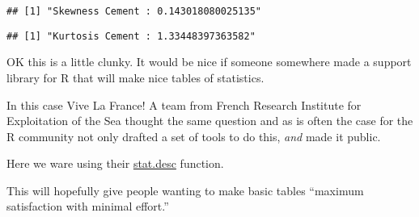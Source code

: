 \documentclass[]{article}
\newenvironment{Shaded}{\begin{snugshade}}{\end{snugshade}}
\newcommand{\CommentTok}[1]{\textcolor[rgb]{0.56,0.35,0.01}{\textit{#1}}}
\newcommand{\DataTypeTok}[1]{\textcolor[rgb]{0.13,0.29,0.53}{#1}}
\newcommand{\DecValTok}[1]{\textcolor[rgb]{0.00,0.00,0.81}{#1}}
\newcommand{\FloatTok}[1]{\textcolor[rgb]{0.00,0.00,0.81}{#1}}
\newcommand{\KeywordTok}[1]{\textcolor[rgb]{0.13,0.29,0.53}{\textbf{#1}}}
\newcommand{\NormalTok}[1]{#1}
\newcommand{\OperatorTok}[1]{\textcolor[rgb]{0.81,0.36,0.00}{\textbf{#1}}}
\newcommand{\OtherTok}[1]{\textcolor[rgb]{0.56,0.35,0.01}{#1}}
\newcommand{\StringTok}[1]{\textcolor[rgb]{0.31,0.60,0.02}{#1}}
\begin{document}
\begin{verbatim}
## [1] "Skewness Cement : 0.143018080025135"
\end{verbatim}

\begin{Shaded}
\end{Shaded}

\begin{verbatim}
## [1] "Kurtosis Cement : 1.33448397363582"
\end{verbatim}

OK this is a little clunky. It would be nice if someone somewhere made a
support library for R that will make nice tables of statistics.

In this case Vive La France! A team from French Research Institute for
Exploitation of the Sea thought the same question and as is often the
case for the R community not only drafted a set of tools to do this,
\emph{and} made it public.

Here we ware using their
\href{https://www.rdocumentation.org/packages/pastecs/versions/1.3.21/topics/stat.desc}{stat.desc}
function.

This will hopefully give people wanting to make basic tables ``maximum
satisfaction with minimal effort.''

\begin{Shaded}
\end{Shaded}
\end{document}
